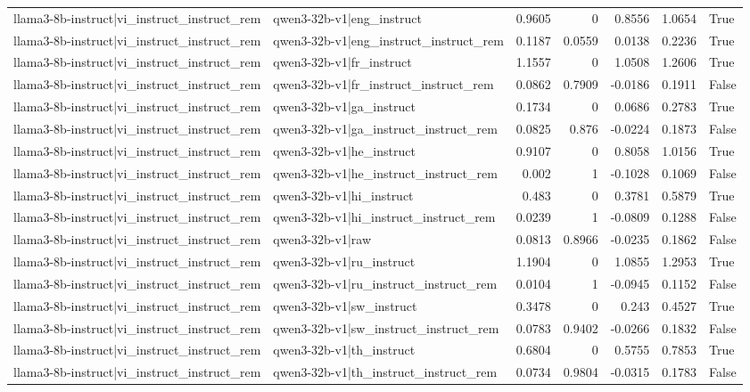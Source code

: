 \begin{table}
\begin{tabular}{l l r r r r l}
llama3-8b-instruct|vi_instruct_instruct_rem & qwen3-32b-v1|eng_instruct & 0.9605 & 0 & 0.8556 & 1.0654 & True \\
llama3-8b-instruct|vi_instruct_instruct_rem & qwen3-32b-v1|eng_instruct_instruct_rem & 0.1187 & 0.0559 & 0.0138 & 0.2236 & True \\
llama3-8b-instruct|vi_instruct_instruct_rem & qwen3-32b-v1|fr_instruct & 1.1557 & 0 & 1.0508 & 1.2606 & True \\
llama3-8b-instruct|vi_instruct_instruct_rem & qwen3-32b-v1|fr_instruct_instruct_rem & 0.0862 & 0.7909 & -0.0186 & 0.1911 & False \\
llama3-8b-instruct|vi_instruct_instruct_rem & qwen3-32b-v1|ga_instruct & 0.1734 & 0 & 0.0686 & 0.2783 & True \\
llama3-8b-instruct|vi_instruct_instruct_rem & qwen3-32b-v1|ga_instruct_instruct_rem & 0.0825 & 0.876 & -0.0224 & 0.1873 & False \\
llama3-8b-instruct|vi_instruct_instruct_rem & qwen3-32b-v1|he_instruct & 0.9107 & 0 & 0.8058 & 1.0156 & True \\
llama3-8b-instruct|vi_instruct_instruct_rem & qwen3-32b-v1|he_instruct_instruct_rem & 0.002 & 1 & -0.1028 & 0.1069 & False \\
llama3-8b-instruct|vi_instruct_instruct_rem & qwen3-32b-v1|hi_instruct & 0.483 & 0 & 0.3781 & 0.5879 & True \\
llama3-8b-instruct|vi_instruct_instruct_rem & qwen3-32b-v1|hi_instruct_instruct_rem & 0.0239 & 1 & -0.0809 & 0.1288 & False \\
llama3-8b-instruct|vi_instruct_instruct_rem & qwen3-32b-v1|raw & 0.0813 & 0.8966 & -0.0235 & 0.1862 & False \\
llama3-8b-instruct|vi_instruct_instruct_rem & qwen3-32b-v1|ru_instruct & 1.1904 & 0 & 1.0855 & 1.2953 & True \\
llama3-8b-instruct|vi_instruct_instruct_rem & qwen3-32b-v1|ru_instruct_instruct_rem & 0.0104 & 1 & -0.0945 & 0.1152 & False \\
llama3-8b-instruct|vi_instruct_instruct_rem & qwen3-32b-v1|sw_instruct & 0.3478 & 0 & 0.243 & 0.4527 & True \\
llama3-8b-instruct|vi_instruct_instruct_rem & qwen3-32b-v1|sw_instruct_instruct_rem & 0.0783 & 0.9402 & -0.0266 & 0.1832 & False \\
llama3-8b-instruct|vi_instruct_instruct_rem & qwen3-32b-v1|th_instruct & 0.6804 & 0 & 0.5755 & 0.7853 & True \\
llama3-8b-instruct|vi_instruct_instruct_rem & qwen3-32b-v1|th_instruct_instruct_rem & 0.0734 & 0.9804 & -0.0315 & 0.1783 & False \\

\end{tabular}
\end{table}
